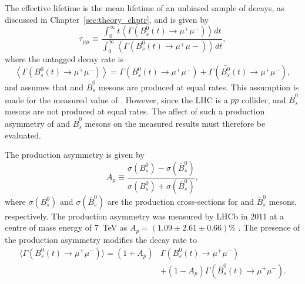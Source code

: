 The \bsmumu effective lifetime is the mean lifetime of an unbiased sample of \bsmumu decays, as discussed in Chapter~\ref{sec:theory_chptr}, and is given by
\begin{equation}
 \tau_{\mu\mu} \equiv \frac{\int^\infty_0 t \left<\Gamma \left( B^{0}_s(t) \rightarrow \mu^{+} \mu^{-} \right) \right> dt }{\int^\infty_0 \left<\Gamma \left( B^{0}_s(t) \rightarrow \mu^{+} \mu{-} \right) \right> dt },
\label{eq:el}
\end{equation}
where the untagged decay rate is
\begin{equation}
\left< \Gamma \left( B^0_s(t) \rightarrow \mu^{+} \mu^{-} \right)\right>  = \Gamma \left ( B^0_s(t) \rightarrow \mu^{+}\mu^{-} \right) + \Gamma \left ( \bar{B^0_s}(t) \rightarrow \mu^{+} \mu^{-} \right),
\end{equation}
and assumes that \bs and $\overline{B}^{0}_{s}$ mesons are produced at equal rates. This assumption is made for the measured value of \tmumu. However, since the LHC is a $pp$ collider, \bs and $\overline{B}^{0}_{s}$ mesons are not produced at equal rates. The affect of such a production asymmetry of \bs and $\overline{B}^{0}_{s}$ mesons on the measured results must therefore be evaluated. 

The production asymmetry is given by 
\begin{equation}
 A_{p} \equiv \frac{\sigma\left(B^{0}_{s}\right) - \sigma\left(\overline{B}^{0}_{s}\right)}{\sigma\left(B^{0}_{s}\right) + \sigma\left(\overline{B}^{0}_{s}\right)},
\label{eq:Ap}
\end{equation}
where $\sigma\left(B^{0}_{s}\right)$ and $\sigma\left(\overline{B}^{0}_{s}\right)$ are the production cross-sections for \bs and $\overline{B}^{0}_{s}$ mesons, respectively. The production asymmetry was measured by LHCb in 2011 at a centre of mass energy of 7~TeV as $ A_{p} = (1.09 \pm 2.61 \pm 0.66) \%$ \cite{Aaij:2014bba}. The presence of the production asymmetry modifies the \bsmumu decay rate to
\begin{align}
\langle \Gamma\left( B^0_s(t) \rightarrow \mu^{+}\mu^{-}\right) \rangle= (1+A_p)&\Gamma(B^0_s(t)\rightarrow \mu^{+} \mu^{-}) \nonumber \\
&  + (1-A_p)\Gamma(\overline{B}^0_s(t)\rightarrow \mu^{+} \mu^{-}).
\label{eq:modifieddecayrate}
\end{align}

